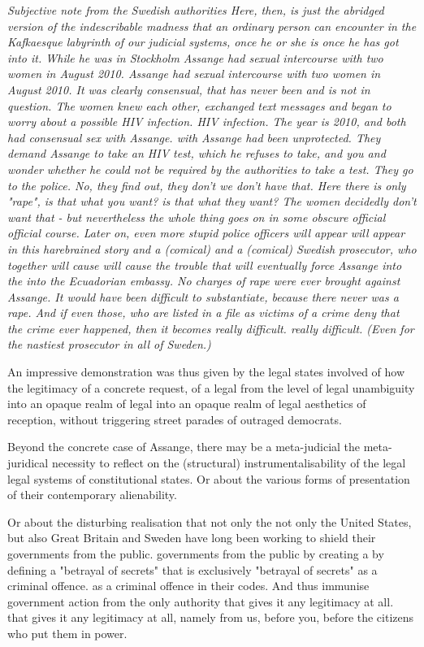 \begin{multicols}{2}
\textit{Subjective note from the Swedish authorities \linebreak
Here, then, is just the abridged version of the indescribable madness that an ordinary person can encounter in the Kafkaesque labyrinth of our judicial systems, once he or she is
once he has got into it. While he was in Stockholm
Assange had sexual intercourse with two women in August 2010.
Assange had sexual intercourse with two women in August 2010. It was
clearly consensual, that has never been and is not
in question. The women knew each other, exchanged text messages and began to worry about a possible HIV infection.
HIV infection. The year is
2010, and both had consensual sex with Assange.
with Assange had been unprotected. They demand
Assange to take an HIV test, which he refuses to take, and you
and wonder whether he could not be required by the authorities to take a test. They go to the police. No, they find out, they don't
we don't have that. Here there is only "rape", is that what you want?
is that what they want? The women decidedly don't want that - but nevertheless
the whole thing goes on in some obscure official
official course. Later on, even more stupid police officers will appear
will appear in this harebrained story and a (comical)
and a (comical) Swedish prosecutor, who together will cause
will cause the trouble that will eventually force Assange into the
into the Ecuadorian embassy. No charges of rape were ever brought against Assange. It
would have been difficult to substantiate,
because there never was a rape. And if even those,
who are listed in a file as victims of a crime deny that the crime ever happened, then it becomes really difficult.
really difficult. (Even for the nastiest prosecutor in all of Sweden.)}

An impressive demonstration was thus given by the legal states involved of how the legitimacy of a concrete request, of a legal
from the level of legal unambiguity into an opaque realm of legal
into an opaque realm of legal aesthetics of reception, without triggering street parades of outraged democrats.

Beyond the concrete case of Assange, there may be a meta-judicial
the meta-juridical necessity to reflect on the (structural) instrumentalisability of the legal
legal systems of constitutional states. Or
about the various forms of presentation of their contemporary alienability.

Or about the disturbing realisation that not only the
not only the United States, but also Great Britain and Sweden have long been working to shield their governments from the public.
governments from the public by creating a
by defining a "betrayal of secrets" that is exclusively
"betrayal of secrets" as a criminal offence.
as a criminal offence in their codes. And thus immunise government action from the only authority that gives it any legitimacy at all.
that gives it any legitimacy at all, namely from us,
before you, before the citizens who put them in power.


\end{multicols}
